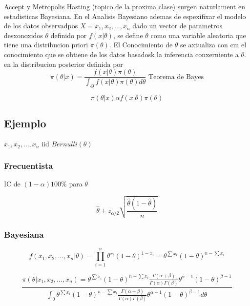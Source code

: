 \documentclass[10pt, oneside]{article}
\begin{document}
Accept y Metropolis Hasting (topico de la proxima clase) surgen naturlament en estadisticas Bayesiana. En el Analisis Bayesiano
ademas de espexifixar el modelo de los datos observadpos $X = x_1, x_2, \ldots, x_n$ dado un vector de parametros desxonoxidos $\theta$
definido por $f(x|\theta)$, se define $\theta$ como una variable aleatoria que tiene una distribucion priori $\pi(\theta)$. El
Conocimiento de $\theta$ se axtualiza con cm el conocimiento que se obtiene de los datos basadosk la inferencia conxerniente a $\theta$.
en la distribucion posterior definida por
$$
	\pi(\theta|x) = \frac{f(x|\theta) \pi(\theta)}{\int_{\Theta} f(x|\theta) \pi(\theta) d\theta} \text{ Teorema de Bayes}
$$

$$
	\pi(\theta|x) \alpha f(x|\theta) \pi(\theta)
$$

\subsection{Ejemplo}

$x_1, x_2, \ldots, x_n$ iid $Bernulli(\theta)$

\subsubsection{Frecuentista}

IC de $(1-\alpha)100\%$ para $\theta$

$$
	\hat{\theta} \pm z_{\alpha/2} \sqrt{\frac{\hat{\theta}(1-\hat{\theta})}{n}}
$$


\subsubsection{Bayesiana}

$$
	f(x_1, x_2, \ldots, x_n|\theta) = \prod_{i=1}^{n} \theta^{x_i} (1-\theta)^{1-x_i} = \theta^{\sum x_i} (1-\theta)^{n-\sum x_i}
$$

$$
	\frac{\pi(\theta| x_1, x_2, \ldots, x_n) = \theta^{\sum x_i} (1-\theta)^{n-\sum x_i} \frac{\Gamma(\alpha + \beta)}{\Gamma(\alpha) \Gamma(\beta)}\theta^{\alpha - 1} (1-\theta)^{\beta - 1}}
	{\int_{0} \theta^{\sum x_i} (1-\theta)^{n-\sum x_i} \frac{\Gamma(\alpha + \beta)}{\Gamma(\alpha) \Gamma(\beta)}\theta^{\alpha - 1} (1-\theta)^{\beta - 1} d\theta}
$$
\end{document}
